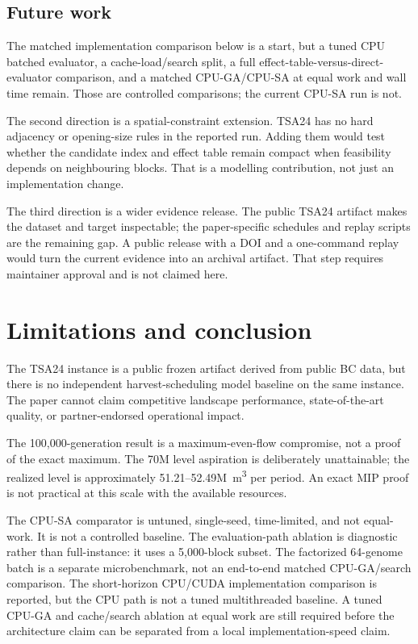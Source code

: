 \documentclass[11pt]{article}
\begin{document}
\subsection{Future work}

The matched implementation comparison below is a start, but a tuned CPU batched evaluator, a
cache-load/search split, a full effect-table-versus-direct-evaluator comparison, and a matched
CPU-GA/CPU-SA at equal work and wall time remain. Those are controlled comparisons; the current
CPU-SA run is not.

The second direction is a spatial-constraint extension. TSA24 has no hard adjacency or opening-size
rules in the reported run. Adding them would test whether the candidate index and effect table remain
compact when feasibility depends on neighbouring blocks. That is a modelling contribution, not just
an implementation change.

The third direction is a wider evidence release. The public TSA24 artifact makes the dataset and
target inspectable; the paper-specific schedules and replay scripts are the remaining gap. A public
release with a DOI and a one-command replay would turn the current evidence into an archival artifact.
That step requires maintainer approval and is not claimed here.

\section{Limitations and conclusion}\label{limitations-and-conclusion}

The TSA24 instance is a public frozen artifact derived from public BC data, but
there is no independent harvest-scheduling model baseline on the same instance.
The paper cannot claim competitive landscape performance, state-of-the-art
quality, or partner-endorsed operational impact.

The 100,000-generation result is a maximum-even-flow compromise, not a proof of
the exact maximum. The 70M level aspiration is deliberately unattainable; the
realized level is approximately 51.21--52.49M~m\textsuperscript{3} per period. An
exact MIP proof is not practical at this scale with the available resources.

The CPU-SA comparator is untuned, single-seed, time-limited, and not equal-work.
It is not a controlled baseline. The evaluation-path ablation is diagnostic rather than full-instance:
it uses a 5,000-block subset. The factorized 64-genome batch is a separate microbenchmark, not an
end-to-end matched CPU-GA/search comparison. The short-horizon CPU/CUDA implementation comparison is
reported, but the CPU path is not a tuned multithreaded baseline. A tuned CPU-GA and cache/search
ablation at equal work are still required before the architecture claim can be separated from a
local implementation-speed claim.
\end{document}
